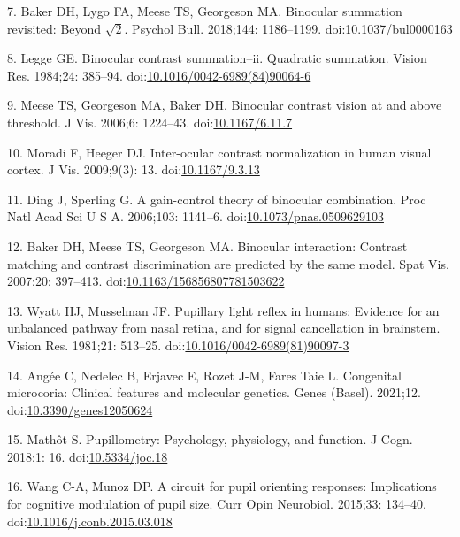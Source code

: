 \documentclass[
]{article}
\begin{document}
\leavevmode\hypertarget{ref-Baker2018}{}%
7. Baker DH, Lygo FA, Meese TS, Georgeson MA. Binocular summation revisited: Beyond \(\sqrt{2}\). Psychol Bull. 2018;144: 1186--1199. doi:\href{https://doi.org/10.1037/bul0000163}{10.1037/bul0000163}

\leavevmode\hypertarget{ref-Legge1984}{}%
8. Legge GE. Binocular contrast summation--ii. Quadratic summation. Vision Res. 1984;24: 385--94. doi:\href{https://doi.org/10.1016/0042-6989(84)90064-6}{10.1016/0042-6989(84)90064-6}

\leavevmode\hypertarget{ref-Meese2006}{}%
9. Meese TS, Georgeson MA, Baker DH. Binocular contrast vision at and above threshold. J Vis. 2006;6: 1224--43. doi:\href{https://doi.org/10.1167/6.11.7}{10.1167/6.11.7}

\leavevmode\hypertarget{ref-Moradi2009}{}%
10. Moradi F, Heeger DJ. Inter-ocular contrast normalization in human visual cortex. J Vis. 2009;9(3): 13. doi:\href{https://doi.org/10.1167/9.3.13}{10.1167/9.3.13}

\leavevmode\hypertarget{ref-Ding2006}{}%
11. Ding J, Sperling G. A gain-control theory of binocular combination. Proc Natl Acad Sci U S A. 2006;103: 1141--6. doi:\href{https://doi.org/10.1073/pnas.0509629103}{10.1073/pnas.0509629103}

\leavevmode\hypertarget{ref-Baker2007}{}%
12. Baker DH, Meese TS, Georgeson MA. Binocular interaction: Contrast matching and contrast discrimination are predicted by the same model. Spat Vis. 2007;20: 397--413. doi:\href{https://doi.org/10.1163/156856807781503622}{10.1163/156856807781503622}

\leavevmode\hypertarget{ref-Wyatt1981}{}%
13. Wyatt HJ, Musselman JF. Pupillary light reflex in humans: Evidence for an unbalanced pathway from nasal retina, and for signal cancellation in brainstem. Vision Res. 1981;21: 513--25. doi:\href{https://doi.org/10.1016/0042-6989(81)90097-3}{10.1016/0042-6989(81)90097-3}

\leavevmode\hypertarget{ref-Angee2021}{}%
14. Angée C, Nedelec B, Erjavec E, Rozet J-M, Fares Taie L. Congenital microcoria: Clinical features and molecular genetics. Genes (Basel). 2021;12. doi:\href{https://doi.org/10.3390/genes12050624}{10.3390/genes12050624}

\leavevmode\hypertarget{ref-Mathot2018}{}%
15. Mathôt S. Pupillometry: Psychology, physiology, and function. J Cogn. 2018;1: 16. doi:\href{https://doi.org/10.5334/joc.18}{10.5334/joc.18}

\leavevmode\hypertarget{ref-Wang2015}{}%
16. Wang C-A, Munoz DP. A circuit for pupil orienting responses: Implications for cognitive modulation of pupil size. Curr Opin Neurobiol. 2015;33: 134--40. doi:\href{https://doi.org/10.1016/j.conb.2015.03.018}{10.1016/j.conb.2015.03.018}
\end{document}
